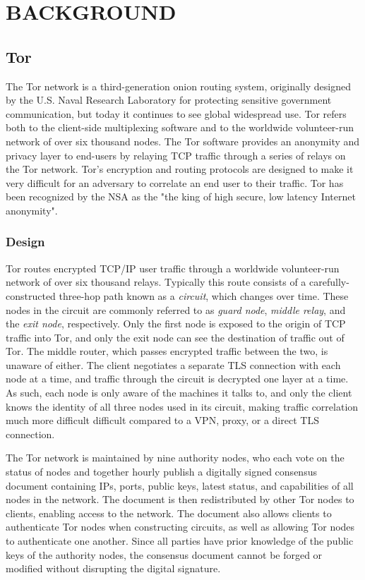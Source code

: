 
\chapter{\uppercase{Background}}

\section{Tor}

The Tor network is a third-generation onion routing system, originally designed by the U.S. Naval Research Laboratory for protecting sensitive government communication, but today it continues to see global widespread use. Tor refers both to the client-side multiplexing software and to the worldwide volunteer-run network of over six thousand nodes. The Tor software provides an anonymity and privacy layer to end-users by relaying TCP traffic through a series of relays on the Tor network. Tor's encryption and routing protocols are designed to make it very difficult for an adversary to correlate an end user to their traffic. Tor has been recognized by the NSA as the "the king of high secure, low latency Internet anonymity".

\subsection{Design}

Tor routes encrypted TCP/IP user traffic through a worldwide volunteer-run network of over six thousand relays. Typically this route consists of a carefully-constructed three-hop path known as a \textit{circuit}, which changes over time. These nodes in the circuit are commonly referred to as \textit{guard node}, \textit{middle relay}, and the \textit{exit node}, respectively. Only the first node is exposed to the origin of TCP traffic into Tor, and only the exit node can see the destination of traffic out of Tor. The middle router, which passes encrypted traffic between the two, is unaware of either. The client negotiates a separate TLS connection with each node at a time, and traffic through the circuit is decrypted one layer at a time. As such, each node is only aware of the machines it talks to, and only the client knows the identity of all three nodes used in its circuit, making traffic correlation much more difficult difficult compared to a VPN, proxy, or a direct TLS connection.

The Tor network is maintained by nine authority nodes, who each vote on the status of nodes and together hourly publish a digitally signed consensus document containing IPs, ports, public keys, latest status, and capabilities of all nodes in the network. The document is then redistributed by other Tor nodes to clients, enabling access to the network. The document also allows clients to authenticate Tor nodes when constructing circuits, as well as allowing Tor nodes to authenticate one another. Since all parties have prior knowledge of the public keys of the authority nodes, the consensus document cannot be forged or modified without disrupting the digital signature.\cite{Xin2009}

